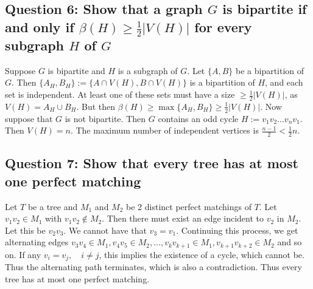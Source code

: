 \documentclass[letterpaper, 11pt]{article}
\newcommand{\1}{\mathds{1}}	%
\theoremstyle{definition}
\begin{document}
\begin{center}
\end{center}

\subsection*{Question 6: Show that a graph $G$ is bipartite if and only if $\beta (H) \ge \frac{1}{2} |V(H)|$ for every subgraph $H$ of $G$}
Suppose $G$ is bipartite and $H$ is a subgraph of $G$. Let $\{A,B\}$ be a bipartition of $G$. Then $\{A_H, B_H\} := \{A \cap V(H), B \cap V(H)\}$ is a bipartition of $H$, and each set is independent. At least one of these sets must have a size $\ge \frac{1}{2}|V(H)|$, as $V(H) = A_H \cup B_H$. But then $\beta(H) \ge \max \{A_H, B_H\} \ge \frac{1}{2}|V(H)|$. Now suppose that $G$ is not bipartite. Then $G$ contains an odd cycle $H := v_1v_2... v_n v_1$. Then $V(H) = n$. The maximum number of independent vertices is $\frac{n-1}{2} < \frac{1}{2}n$. 

\subsection*{Question 7: Show that every tree has at most one perfect matching}
Let $T$ be a tree and $M_1$ and $M_2$ be 2 distinct perfect matchings of $T$. Let $v_1v_2 \in M_1$ with $v_1v_2 \notin M_2$. Then there must exist an edge incident to $v_2$ in $M_2$. Let this be $v_2v_3$. We cannot have that $v_3 = v_1$. Continuing this process, we get alternating edges $v_3 v_4 \in M_1, v_4v_5 \in M_2, ..., v_kv_{k+1} \in M_1, v_{k+1}v_{k+2} \in M_2$ and so on. If any $v_i = v_j, \quad i \ne j$, this implies the existence of a cycle, which cannot be. Thus the alternating path terminates, which is also a contradiction. Thus every tree has at most one perfect matching.
\end{document}
